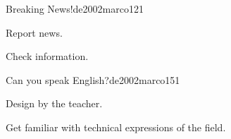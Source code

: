 \begin{syllabus}
\begin{unit}{Breaking News!}{de2002marco}{12}{1}
   \begin{learningoutcomes}
      \item Report news.
      \item Check information.
   \end{learningoutcomes}

\end{unit}

\begin{unit}{Can you speak English?}{de2002marco}{15}{1}
   \begin{topics}
      \item Design by the teacher.
   \end{topics}

   \begin{learningoutcomes}
      \item Get familiar with technical expressions of the field.
   \end{learningoutcomes}
\end{unit}

\begin{coursebibliography}
\end{coursebibliography}
\end{syllabus}
%

